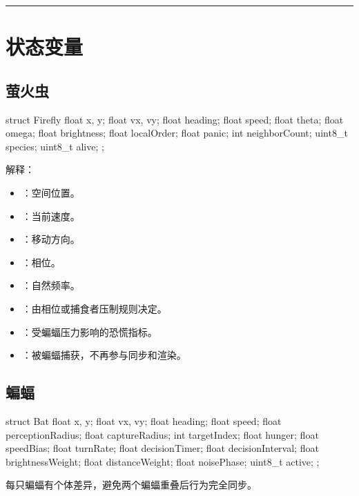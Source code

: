 \documentclass[UTF8]{ctexart}
\begin{document}
\bigskip
\hrule
\bigskip

\section{状态变量}

\subsection{萤火虫}

\begin{codeblock}
struct Firefly {
  float x, y;
  float vx, vy;
  float heading;
  float speed;
  float theta;
  float omega;
  float brightness;
  float localOrder;
  float panic;
  int neighborCount;
  uint8_t species;
  uint8_t alive;
};
\end{codeblock}

解释：

\begin{itemize}
\item \texttt{}：空间位置。
\item \texttt{}：当前速度。
\item \texttt{}：移动方向。
\item \texttt{}：相位。
\item \texttt{}：自然频率。
\item \texttt{}：由相位或捕食者压制规则决定。
\item \texttt{}：受蝙蝠压力影响的恐慌指标。
\item \texttt{}：被蝙蝠捕获，不再参与同步和渲染。
\end{itemize}

\subsection{蝙蝠}

\begin{codeblock}
struct Bat {
  float x, y;
  float vx, vy;
  float heading;
  float speed;
  float perceptionRadius;
  float captureRadius;
  int targetIndex;
  float hunger;
  float speedBias;
  float turnRate;
  float decisionTimer;
  float decisionInterval;
  float brightnessWeight;
  float distanceWeight;
  float noisePhase;
  uint8_t active;
};
\end{codeblock}

每只蝙蝠有个体差异，避免两个蝙蝠重叠后行为完全同步。
\end{document}
